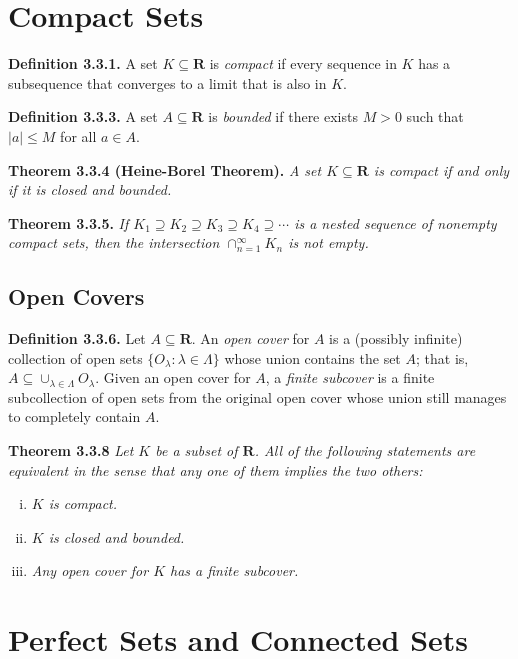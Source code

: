 \documentclass[12pt]{report}
\newcommand{\R}{\textbf{R}}
\begin{document}
\section{Compact Sets}

\noindent \textbf{Definition 3.3.1.} A set $K\subseteq\R$ is \textit{compact} if every sequence in $K$ has a subsequence that converges to a limit that is also in $K$.
\bigskip

\noindent \textbf{Definition 3.3.3.} A set $A\subseteq\R$ is \textit{bounded} if there exists $M>0$ such that $|a|\leq M$ for all $a\in A$.
\bigskip

\noindent \textbf{Theorem 3.3.4 (Heine-Borel Theorem).} \textit{A set $K\subseteq\R$ is compact if and only if it is closed and bounded.}
\bigskip

\noindent \textbf{Theorem 3.3.5.} \textit{If $K_1\supseteq K_2\supseteq K_3\supseteq K_4\supseteq\cdots$ is a nested sequence of nonempty compact sets, then the intersection $\cap_{n=1}^\infty K_n$ is not empty.}
\bigskip

\subsection*{Open Covers}

\noindent \textbf{Definition 3.3.6.} Let $A\subseteq\R$.  An \textit{open cover} for $A$ is a (possibly infinite) collection of open sets $\{O_\lambda:\lambda\in\Lambda\}$ whose union contains the set $A$; that is, $A\subseteq\cup_{\lambda\in\Lambda}O_\lambda$.  Given an open cover for $A$, a \textit{finite subcover} is a finite subcollection of open sets from the original open cover whose union still manages to completely contain $A$.
\bigskip

\noindent \textbf{Theorem 3.3.8} \textit{Let $K$ be a subset of $\R$.  All of the following statements are equivalent in the sense that any one of them implies the two others:}

\begin{enumerate}[(i)]
\item \textit{$K$ is compact.}
\item \textit{$K$ is closed and bounded.}
\item \textit{Any open cover for $K$ has a finite subcover.}
\end{enumerate}

\section{Perfect Sets and Connected Sets}
\end{document}
